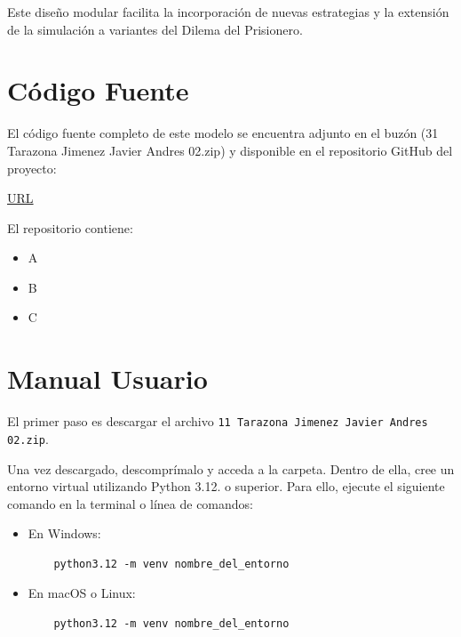 \documentclass{article}
\begin{document}
Este diseño modular facilita la incorporación de nuevas estrategias y 
la extensión de la simulación a variantes del Dilema del Prisionero.



\section{Código Fuente}\label{sec:cod}

El código fuente completo de este modelo se encuentra adjunto en el buzón 
(31 Tarazona Jimenez Javier Andres 02.zip)
y disponible en el repositorio GitHub del proyecto:

\begin{center}
\url{URL}
\end{center}

El repositorio contiene:
\begin{itemize}
\item A
\item B
\item C
\end{itemize}


\section{Manual Usuario}\label{sec:man_u}

El primer paso es descargar el archivo \texttt{11 Tarazona Jimenez Javier Andres 02.zip}.

Una vez descargado, descomprímalo y acceda a la carpeta. Dentro de ella, cree un 
entorno virtual utilizando Python 3.12. o superior. Para ello, ejecute el siguiente 
comando en 
la terminal o línea de comandos:

\begin{itemize}
  \item En Windows:
  \begin{verbatim}
    python3.12 -m venv nombre_del_entorno
  \end{verbatim}
  \item En macOS o Linux:
  \begin{verbatim}
    python3.12 -m venv nombre_del_entorno
  \end{verbatim}
\end{itemize}
\end{document}
